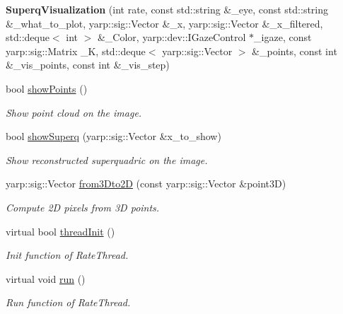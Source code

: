 \begin{DoxyCompactItemize}
\item 
\mbox{\label{classSuperqVisualization_ac387ba6f204a820657e399cedbe84d43}} 
{\bfseries Superq\+Visualization} (int rate, const std\+::string \&\+\_\+eye, const std\+::string \&\+\_\+what\+\_\+to\+\_\+plot, yarp\+::sig\+::\+Vector \&\+\_\+x, yarp\+::sig\+::\+Vector \&\+\_\+x\+\_\+filtered, std\+::deque$<$ int $>$ \&\+\_\+\+Color, yarp\+::dev\+::\+I\+Gaze\+Control $\ast$\+\_\+igaze, const yarp\+::sig\+::\+Matrix \+\_\+K, std\+::deque$<$ yarp\+::sig\+::\+Vector $>$ \&\+\_\+points, const int \&\+\_\+vis\+\_\+points, const int \&\+\_\+vis\+\_\+step)
\item 
bool \mbox{\hyperlink{classSuperqVisualization_aea374f59e3b941e688c1ddafad8896b9}{show\+Points}} ()
\begin{DoxyCompactList}\small\item\em Show point cloud on the image. \end{DoxyCompactList}\item 
bool \mbox{\hyperlink{classSuperqVisualization_aa763f8f73c82d4de1d47b03ae9d2e276}{show\+Superq}} (yarp\+::sig\+::\+Vector \&x\+\_\+to\+\_\+show)
\begin{DoxyCompactList}\small\item\em Show reconstructed superquadric on the image. \end{DoxyCompactList}\item 
yarp\+::sig\+::\+Vector \mbox{\hyperlink{classSuperqVisualization_aff405a4d0ad916decad09f923e319be6}{from3\+Dto2D}} (const yarp\+::sig\+::\+Vector \&point3D)
\begin{DoxyCompactList}\small\item\em Compute 2D pixels from 3D points. \end{DoxyCompactList}\item 
\mbox{\label{classSuperqVisualization_a93dc1583d46a71bbcc4e4ef7f65820b9}} 
virtual bool \mbox{\hyperlink{classSuperqVisualization_a93dc1583d46a71bbcc4e4ef7f65820b9}{thread\+Init}} ()
\begin{DoxyCompactList}\small\item\em Init function of Rate\+Thread. \end{DoxyCompactList}\item 
\mbox{\label{classSuperqVisualization_a46d689c65cec6c04d3fffdbfbbd1838b}} 
virtual void \mbox{\hyperlink{classSuperqVisualization_a46d689c65cec6c04d3fffdbfbbd1838b}{run}} ()
\begin{DoxyCompactList}\small\item\em Run function of Rate\+Thread. \end{DoxyCompactList}\item 

\end{DoxyCompactItemize}
